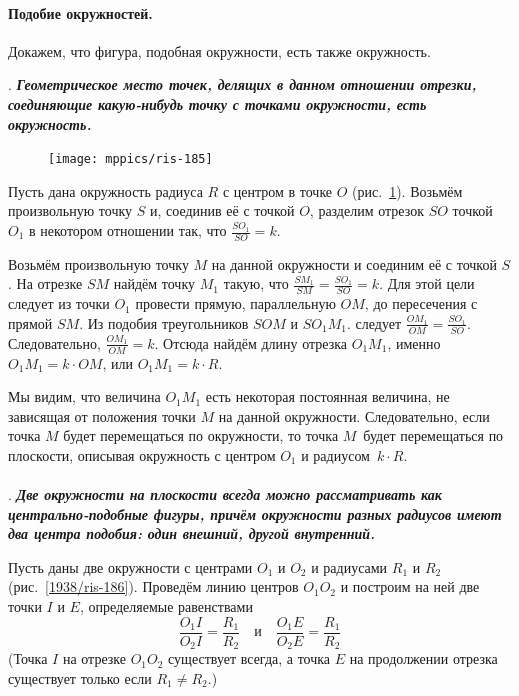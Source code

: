 \documentclass[twoside]{book}
\begin{document}
\paragraph{Подобие окружностей.}\label{1938/178}
Докажем, что фигура, подобная окружности, есть также окружность.


\smallskip

{\sloppy

.
\textbf{\emph{Геометрическое место точек, делящих в данном отношении отрезки, соединяющие какую-нибудь точку с точками окружности, есть окружность.}}

}

\begin{figure}[h]
\centering
\texttt{[image: mppics/ris-185]}
\caption{}\label{1938/ris-185}
\end{figure}

Пусть дана окружность радиуса $R$ с центром в точке $O$ (рис.~\ref{1938/ris-185}).
Возьмём произвольную точку $S$ и, соединив её с точкой $O$, разделим отрезок $SO$ точкой $O_1$ в некотором отношении так, что $\frac{SO_1}{SO}= k$.

Возьмём произвольную точку $M$ на данной окружности и соединим её с точкой $S$.
На отрезке $SM$ найдём точку $M_1$ такую, что $\frac{SM_1}{SM}=\frac{SO_1}{SO}= k$.
Для этой цели следует из точки $O_1$ провести прямую, параллельную $OM$, до пересечения с прямой $SM$.
Из подобия треугольников $SOM$ и $SO_1M_1$.
следует $\frac{OM_1}{OM}=\frac{SO_1}{SO}$.
Следовательно, $\frac{OM_1}{OM}=k$.
Отсюда найдём длину отрезка $O_1M_1$, именно $O_1M_1=k\cdot OM$, или $O_1M_1=k\cdot R$.

Мы видим, что величина $O_1M_1$ есть некоторая постоянная величина, не зависящая от положения точки $M$ на данной окружности.
Следовательно, если точка $M$ будет перемещаться по окружности, то точка $M$\ будет перемещаться по плоскости, описывая окружность с центром $O_1$ и радиусом~$k\cdot R$.

\paragraph{}\label{1938/179}
.
\textbf{\emph{Две окружности на плоскости всегда можно рассматривать как центрально-подобные фигуры, причём окружности разных радиусов имеют два центра подобия:
один внешний, другой внутренний.}} 

Пусть даны две окружности с центрами $O_1$ и $O_2$ и радиусами $R_1$ и $R_2$ (рис.~\ref{1938/ris-186}).
Проведём линию центров $O_1O_2$ и построим на ней две точки $I$ и $E$, определяемые равенствами
\[\frac{O_1I}{O_2I}=\frac{R_1}{R_2}\quad\text{и}\quad\frac{O_1E}{O_2E}=\frac{R_1}{R_2}\]
(Точка $I$ на отрезке $O_1O_2$ существует всегда, а точка $E$ на продолжении отрезка существует только если $R_1\ne R_2$.)
\end{document}
